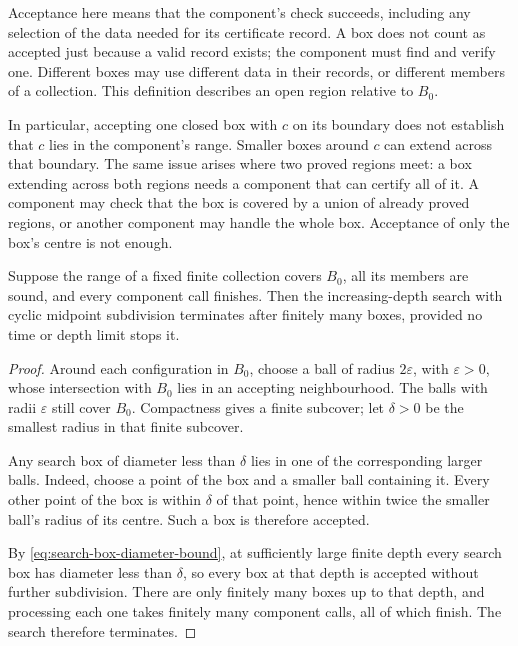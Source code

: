Acceptance here means that the component's check succeeds, including any
selection of the data needed for its certificate record. A box does not count
as accepted just because a valid record exists; the component must find and
verify one. Different boxes may use different data in their records, or
different members of a collection. This definition describes an open region
relative to $B_0$.

In particular, accepting one closed box with $c$ on its boundary does not
establish that $c$ lies in the component's range. Smaller boxes around $c$
can extend across that boundary. The same issue arises where two proved
regions meet: a box extending across both regions needs a component that can
certify all of it. A component may check that the box is covered by a union of already
proved regions, or another component may handle the whole box. Acceptance
of only the box's centre is not enough.

\begin{lemma}\label{lem:finite-completion-from-local-coverage}
  Suppose the range of a fixed finite collection covers $B_0$, all its
  members are sound, and every component call finishes. Then the increasing-depth search
  with cyclic midpoint subdivision terminates after finitely many boxes,
  provided no time or depth limit stops it.
\end{lemma}
\begin{proof}
  Around each configuration in $B_0$, choose a ball of radius $2\varepsilon$, with
  $\varepsilon>0$, whose intersection with $B_0$ lies in an accepting
  neighbourhood. The balls with radii $\varepsilon$ still cover $B_0$.
  Compactness gives a finite subcover; let $\delta>0$ be the smallest
  radius in that finite subcover.

  Any search box of diameter less than $\delta$ lies in one of the
  corresponding larger balls. Indeed, choose a point of the box and a
  smaller ball containing it. Every other point of the box is within
  $\delta$ of that point, hence within twice the smaller ball's radius
  of its centre. Such a box is therefore accepted.

  By \cref{eq:search-box-diameter-bound}, at sufficiently large finite
  depth every search box has diameter less than $\delta$, so every box
  at that depth is accepted without further subdivision.
  There are only finitely many boxes up to that depth, and processing each
  one takes finitely many component calls, all of which finish. The search
  therefore terminates.
\end{proof}

